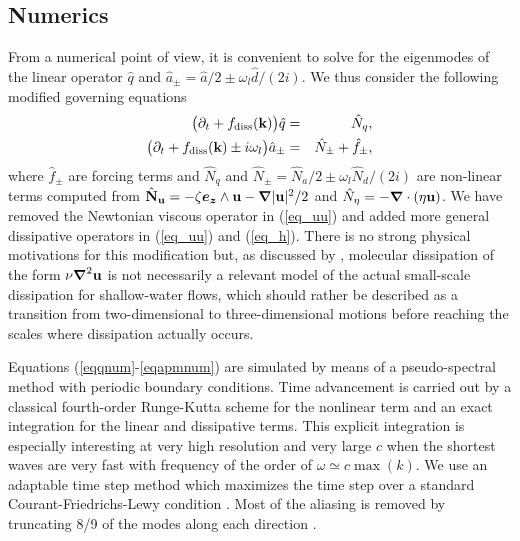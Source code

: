 



\subsection{Numerics}

From a numerical point of view, it is convenient to solve for the
eigenmodes of the linear operator $\hat q$ and $\hat a_\pm = \hat a
/2 \pm \omega_l \hat d /(2i)$.
%
We thus consider the following modified governing equations
\begin{eqnarray}
\bigl( \p_t  + \fdiss(\kk) \bigl) \hat q  
&=& \hat N_q  ,\label{eqqnum} \\
\bigl( \p_t  + \fdiss(\kk) \pm  i \omega_l \bigl)  \hat a_\pm  
&=& \hat N_{\pm} + \hat f_{\pm}, \label{eqapmnum}
\end{eqnarray}
where $\hat f_{\pm}$ are forcing terms and %
$\hat N_q$ and %
$\hat N_\pm = \hat N_a /2 \pm \omega_l \hat N_d/(2i)$ %
are non-linear terms computed from %
$\hat {\textbf{N}}_{\textbf{u}} = - \zeta \boldsymbol{e_z} \wedge \textbf{u} - \boldsymbol{\nabla} |\textbf{u}|^2/2$ and %
$\hat N_\eta = - \boldsymbol{\nabla} \cdot (\eta \textbf{u})$.
%
We have removed the Newtonian viscous operator in (\ref{eq_uu}) and
added more general dissipative operators in (\ref{eq_uu}) and
(\ref{eq_h}).  There is no strong physical motivations for this
modification but, as discussed by \cite{FargeSadourny1989}, molecular
dissipation of the form $\nu \boldsymbol{\nabla}^2 \textbf{u}$ is not necessarily a
relevant model of the actual small-scale dissipation for shallow-water
flows, which should rather be described as a transition from
two-dimensional to three-dimensional motions before reaching the
scales where dissipation actually occurs.




Equations (\ref{eqqnum}-\ref{eqapmnum}) are simulated by means of a
pseudo-spectral method with periodic boundary conditions.
%
Time advancement is carried out by a classical fourth-order
Runge-Kutta scheme for the nonlinear term and an exact integration for
the linear and dissipative terms.  This explicit integration is
especially interesting at very high resolution and very large $c$ when
the shortest waves are very fast with frequency of the order of
$\omega \simeq c \max(k)$.
%
We use an adaptable time step method which maximizes the time step
over a standard Courant-Friedrichs-Lewy condition
\cite[]{Lundbladh1999, AugierChomazBillant2012}.
%
Most of the aliasing is removed by truncating 8/9 of the modes along
each direction \cite[for a detail discussion on the issues of the
non-conservation of the non-quadratic energy and the aliasing errors
in the truncated one-layer shallow water model,
see][]{FargeSadourny1989}.




